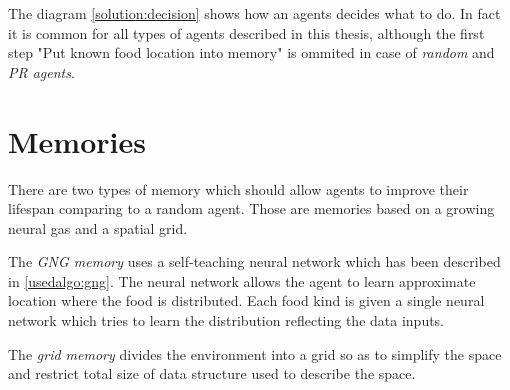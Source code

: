 The diagram \ref{solution:decision} shows how an agents decides what to do. In fact it is common for all types of agents described in this thesis, although the first step "Put known food location into memory" is ommited in case of \emph{random} and \emph{PR agents}.

\section{Memories}

There are two types of memory which should allow agents to improve their lifespan comparing to a random agent. Those are memories based on a growing neural gas and a spatial grid.       

The \emph{GNG memory} uses a self-teaching neural network which has been described in \ref{usedalgo:gng}. The neural network allows the agent to learn approximate location where the food is distributed. Each food kind is given a single neural network which tries to learn the distribution reflecting the data inputs.

The \emph{grid memory} divides the environment into a grid so as to simplify the space and restrict total size of data structure used to describe the space. 




